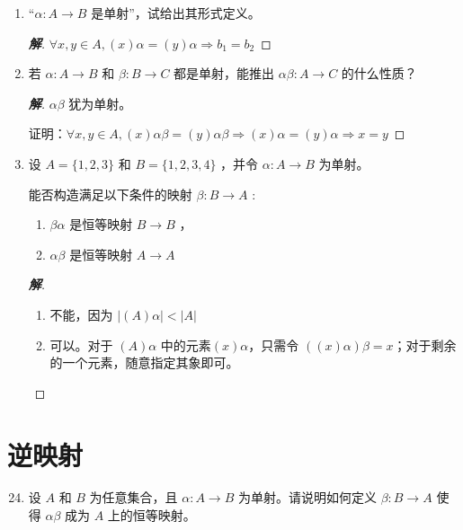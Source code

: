 \documentclass[12pt]{ctexart}
\newenvironment{solution}{\begin{proof}[\indent\bf 解]}{\end{proof}}
\begin{document}
{\begin{enumerate}
\begin{solution}

   \end{solution}

 \item   “\(\alpha  : A \rightarrow  B\) 是单射”，试给出其形式定义。

   \begin{solution}
     $\forall x, y \in A, (x)\alpha = (y)\alpha \Rightarrow b_1 = b_2$
   \end{solution}

 \item  若 \(\alpha  : A \rightarrow  B\) 和 \(\beta  : B \rightarrow  C\) 都是单射，能推出 \({\alpha \beta } : A \rightarrow  C\) 的什么性质？

   \begin{solution}
     $\alpha\beta$ 犹为单射。

     证明：$\forall x,y \in A, (x)\alpha\beta = (y)\alpha\beta \Rightarrow (x)\alpha = (y)\alpha \Rightarrow x = y $
   \end{solution}

\item  设 \(A = \{ 1,2,3\}\) 和 \(B = \{ 1,2,3,4\}\) ，并令 \(\alpha  : A \rightarrow  B\) 为单射。

能否构造满足以下条件的映射 \(\beta  : B \rightarrow  A\) :

\begin{enumerate}
\item \({\beta \alpha }\) 是恒等映射 \(B \rightarrow  B\) ，
\item  \({\alpha \beta }\) 是恒等映射 \(A \rightarrow  A\) 
\end{enumerate}

\begin{solution}
  \begin{enumerate}
  \item 不能，因为 $\left| (A)\alpha \right| < \left| A \right|$
  \item 可以。对于 $(A)\alpha$ 中的元素$(x)\alpha$，只需令 $ \left( (x)\alpha \right)\beta = x$；对于剩余的一个元素，随意指定其象即可。
  \end{enumerate}
\end{solution}
\end{enumerate}


\section*{逆映射}
\begin{enumerate}
  \setcounter{enumi}{23}
\item 设 \(A\) 和 \(B\) 为任意集合，且 \(\alpha  : A \rightarrow  B\) 为单射。请说明如何定义 \(\beta  : B \rightarrow  A\) 使得 \({\alpha \beta }\) 成为 \(A\) 上的恒等映射。


\end{enumerate}}
\end{document}
